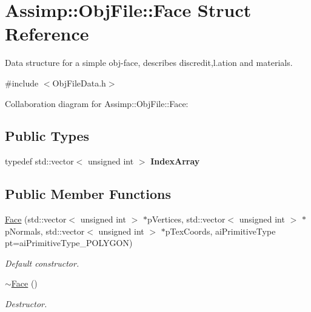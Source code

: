 \hypertarget{struct_assimp_1_1_obj_file_1_1_face}{\section{Assimp\+:\+:Obj\+File\+:\+:Face Struct Reference}
\label{struct_assimp_1_1_obj_file_1_1_face}
}


Data structure for a simple obj-\/face, describes discredit,l.\+ation and materials.  




{\ttfamily \#include $<$Obj\+File\+Data.\+h$>$}



Collaboration diagram for Assimp\+:\+:Obj\+File\+:\+:Face\+:
\subsection*{Public Types}
\begin{DoxyCompactItemize}
\item 
\hypertarget{struct_assimp_1_1_obj_file_1_1_face_ab58a12d35761f490e73c24d2db6d5761}{typedef std\+::vector$<$ unsigned int $>$ {\bfseries Index\+Array}}\label{struct_assimp_1_1_obj_file_1_1_face_ab58a12d35761f490e73c24d2db6d5761}

\end{DoxyCompactItemize}
\subsection*{Public Member Functions}
\begin{DoxyCompactItemize}
\item 
\hyperlink{struct_assimp_1_1_obj_file_1_1_face_a4e0232bebdd27cd35e356cfef3188bfe}{Face} (std\+::vector$<$ unsigned int $>$ $\ast$p\+Vertices, std\+::vector$<$ unsigned int $>$ $\ast$p\+Normals, std\+::vector$<$ unsigned int $>$ $\ast$p\+Tex\+Coords, ai\+Primitive\+Type pt=ai\+Primitive\+Type\+\_\+\+P\+O\+L\+Y\+G\+O\+N)
\begin{DoxyCompactList}\small\item\em Default constructor. \end{DoxyCompactList}\item 
\hypertarget{struct_assimp_1_1_obj_file_1_1_face_ac9ae3aa7bde2140f6c3f81ed1f15e51a}{\hyperlink{struct_assimp_1_1_obj_file_1_1_face_ac9ae3aa7bde2140f6c3f81ed1f15e51a}{$\sim$\+Face} ()}\label{struct_assimp_1_1_obj_file_1_1_face_ac9ae3aa7bde2140f6c3f81ed1f15e51a}

\begin{DoxyCompactList}\small\item\em Destructor. \end{DoxyCompactList}\end{DoxyCompactItemize}
